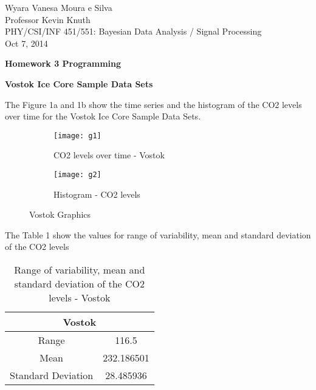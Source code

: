 \documentclass[a4paper, 12pt]{article}
\begin{document}
\begin{flushleft}

Wyara Vanesa Moura e Silva\\
Professor Kevin Knuth \\
PHY/CSI/INF 451/551: Bayesian Data Analysis / Signal Processing \\
Oct 7, 2014\\

\begin{center}
\textbf{Homework 3 Programming}
\end{center}


\setlength{\parindent}{0.5in}

\textbf{Vostok Ice Core Sample Data Sets}

The Figure 1a and 1b show the time series and the histogram of the CO2 levels over time for the Vostok Ice Core Sample Data Sets. 


\begin{figure}[h]
    \centering
    \begin{subfigure}[t]{.4\textwidth}
        \texttt{[image: g1]}
        \caption{CO2 levels over time - Vostok}
        \label{fig:g1}
    \end{subfigure}
    \begin{subfigure}[t]{.40\textwidth}
        \texttt{[image: g2]}
        \caption{Histogram - CO2 levels}
        \label{fig:diff_cosine}
    \end{subfigure}
    \caption{Vostok Graphics}
    \label{fig:cosines}
\end{figure}

The Table 1 show the values for range of variability, mean and standard deviation of the CO2 levels

\begin{table}[ht]
    \centering
    \begin{tabular}{| c | c |}
        \hline
        \multicolumn{2}{|c|}{\textbf{Vostok}} \\
        \hline
        Range & 116.5 \\
        \hline
        Mean & 232.186501 \\
        \hline
        Standard Deviation & 28.485936 \\
        \hline
    \end{tabular}
    \caption{Range of variability, mean and standard deviation of the CO2 levels - Vostok}
    \label{tab:vostokvariability}
\end{table}



\end{flushleft}
\end{document}

